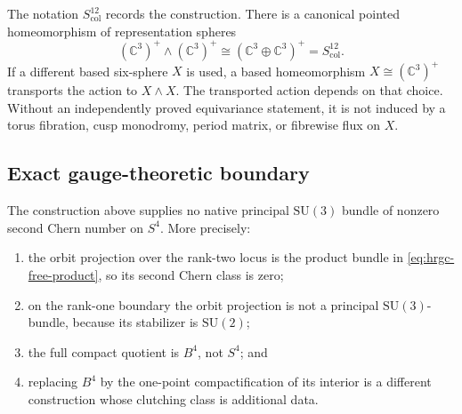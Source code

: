 The notation \(S^{12}_{\mathrm{col}}\) records the construction.  There is a
canonical pointed homeomorphism of representation spheres
\[
 (\mathbb C^3)^+\wedge(\mathbb C^3)^+
 \cong(\mathbb C^3\oplus\mathbb C^3)^+
 =S^{12}_{\mathrm{col}}.
\]
If a different based six-sphere \(X\) is used, a based homeomorphism
\(X\cong(\mathbb C^3)^+\) transports the action to \(X\wedge X\).  The
transported action depends on that choice.  Without an independently proved
equivariance statement, it is not induced by a torus fibration, cusp
monodromy, period matrix, or fibrewise flux on \(X\).

\subsection{Exact gauge-theoretic boundary}

\begin{theorem}
\label{thm:hrgc-no-native-s4-sector}
The construction above supplies no native principal \(\mathrm{SU}(3)\)
bundle of nonzero second Chern number on \(S^4\).  More precisely:
\begin{enumerate}
\item the orbit projection over the rank-two locus is the product bundle in
\eqref{eq:hrgc-free-product}, so its second Chern class is zero;
\item on the rank-one boundary the orbit projection is not a principal
\(\mathrm{SU}(3)\)-bundle, because its stabilizer is \(\mathrm{SU}(2)\);
\item the full compact quotient is \(B^4\), not \(S^4\); and
\item replacing \(B^4\) by the one-point compactification of its interior is
a different construction whose clutching class is additional data.
\end{enumerate}
\end{theorem}


